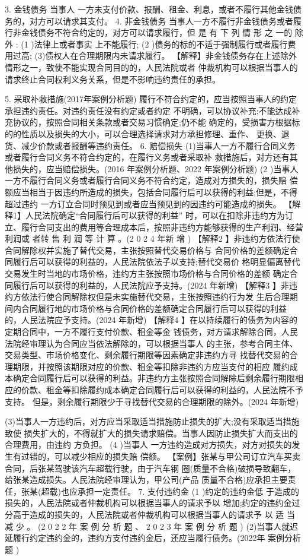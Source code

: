 \documentclass[UTF8,12pt]{ctexart}
\numberwithin{equation}{section} %
\numberwithin{figure}{section}
\numberwithin{table}{section}
\begin{document}
	
	3. 金钱债务
	当事人 一方未支付价款、报酬、租金、利息，或者不履行其他金钱债务的，对方可以请求其支付。 
	4. 非金钱债务 当事人一方不履行非金钱债务或者履行非金钱债务不符合约定的，对方可以请求履行，但 是 有 下 列 情 形 之 一的 除 外 :
	(1 )法律上或者事实 上不能履行;
	(2 )债务的标的不适于强制履行或者履行费用过高; (3)债权人在合理期限内未请求履行。
	【解释】非金钱债务存在上述除外情形之一，致使不能实现合同目的的，人民法院或者 仲裁机构可以根据当事人的请求终止合同权利义务关系，但是不影响违约责任的承担。
	
	5. 采取补救措施(2017年案例分析题) 履行不符合约定的，应当按照当事人的约定承担违约责任。对违约责任没有约定或者约定 不明确，可以协议补充;不能达成补充协议的，按照合同相关条款或者交易习惯确定;仍不能 确定的，受损害方根据标的的性质以及损失的大小，可以合理选择请求对方承担修理、重作、 更换、退货、减少价款或者报酬等违约责任。
	6. 赔偿损失 (1)当事人一方不履行合同义务或者履行合同义务不符合约定的，在履行义务或者采取补 救措施后，对方还有其他损失的，应当赔偿损失。(2016 年案例分析题、2022 年案例分析题) (2 )当事人一方不履行合同义务或者履行合同义务不符合约定，造成对方损失的，损失赔 偿额应当相当于因违约所造成的损失，包括合同履行后可以获得的利益;但是，不得超过违约 一方订立合同时预见到或者应当预见到的因违约可能造成的损失。
	【解释1】人民法院确定“合同履行后可以获得的利益” 时，可以在扣除非违约方为订 立、履行合同支出的费用等合理成本后，按照非违约方能够获得的生产利润、经营利润或 者转 售 利 润 等 计 算 。(2 0 2 4 年新 增 )
	【解释2 】非违约方依法行使合同解除权并实施了替代交易，主张按照替代交易价格与 合同价格的差额确定合同履行后可以获得的利益的，人民法院依法子以支持;替代交易价 格明显偏离替代交易发生时当地的市场价格，违约方主张按照市场价格与合同价格的差额 确定合同履行后可以获得的利益的，人民法院应予支持。(2024 年新增)
	【解释3 】非违约方依法行使合同解除权但是未实施替代交易，主张按照违约行为发 生后合理期间内合同履行地的市场价格与合同价格的差额确定合同履行后可以获得的利益 的，人民法院应予支持。(2024 年新增)
	【解释4 】在以持续履行的债务为内容的定期合同中，一方不履行支付价款、租金等金 钱债务，对方请求解除合同，人民法院经审理认为合同应当依法解除的，可以根据当事人 的主张，参考合同主体、交易类型、市场价格变化、剩余履行期限等因素确定非违约方寻 找替代交易的合理期限，并按照该期限对应的价款、租金等扣除非违约方应当支付的相应 履约成本确定合同履行后可以获得的利益。非违约方主张按照合同解除后剩余履行期限相 应的价款、租金等扣除履约成本确定合同履行后可以获得的利益的，人民法院不予支持。 但是，剩余履行期限少于寻找替代交易的合理期限的除外。(2024 年新增)
	
	(3)当事人一方违约后，对方应当采取适当措施防止损失的扩大;没有采取适当措施致使 损失扩大的，不得就扩大的损失请求赔偿。当事人因防止损失扩大而支出的合理费用，由违约 方负担。
	(4 )当事人 一方违约造成对方损失，对方对损失的发生有过错的，可以减少相应的损失赔 偿额。
	【案例】张某与甲公司订立汽车买卖合同，后张某驾驶该汽车超载行驶，由于汽车钢 圈(质量不合格)破损导致翻车，给张某造成损失。人民法院经审理认为，甲公司(产品 质量不合格)应承担主要责任，张某(超载)也应承担一定责任。
	7. 支付违约金
	(1 )约定的违约金低 于造成的损失的，人民法院或者仲裁机构可以根据当事人的请求予以 增加;约定的违约金过分高于造成的损失的，人民法院或者仲裁机构可以根据当事人的请求予 以 适 当 减 少 。 (2 0 2 2 年 案 例 分 析 题 、 2 0 2 3 年 案 例 分 析 题 ) (2)当事人就迟延履行约定违约金的，违约方支付违约金后，还应当履行债务。(2022年 案例分析题 )
	
\end{document}
